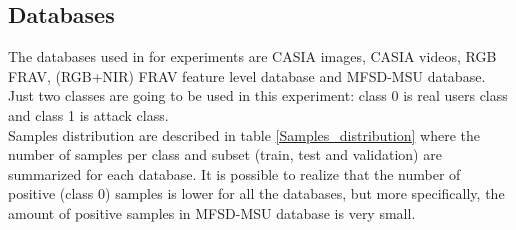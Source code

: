 \subsection{Databases} \label{subssec:ejec1_database}
The databases used in for experiments are CASIA images, CASIA videos, RGB FRAV, (RGB+NIR) FRAV feature level database and MFSD-MSU database. Just two classes are going to be used in this experiment: class 0 is real users class and class 1 is attack class.\\

Samples distribution are described in table \ref{Samples_distribution} where the number of samples per class and  subset (train, test and validation) are summarized for each database. It is possible to realize that the number of positive (class 0) samples is lower for all the databases, but more specifically, the amount of positive samples in MFSD-MSU database is very small.\\


